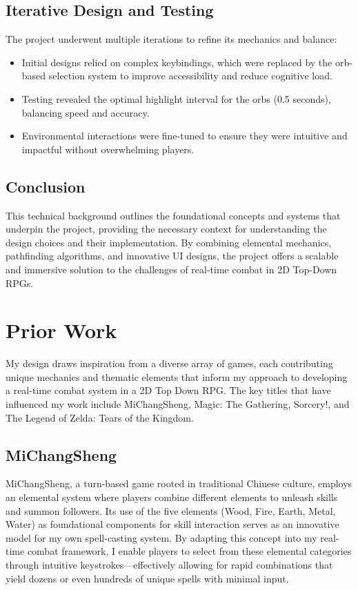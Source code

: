 \documentclass[10pt,twocolumn]{article}
\begin{document}
\subsection{Iterative Design and Testing}
The project underwent multiple iterations to refine its mechanics and balance:
\begin{itemize}
    \item Initial designs relied on complex keybindings, which were replaced by the orb-based selection system to improve accessibility and reduce cognitive load.
    \item Testing revealed the optimal highlight interval for the orbs (0.5 seconds), balancing speed and accuracy.
    \item Environmental interactions were fine-tuned to ensure they were intuitive and impactful without overwhelming players.
\end{itemize}

\subsection{Conclusion}
This technical background outlines the foundational concepts and systems that underpin the project, providing the necessary context for understanding the design choices and their implementation. By combining elemental mechanics, pathfinding algorithms, and innovative UI designs, the project offers a scalable and immersive solution to the challenges of real-time combat in 2D Top-Down RPGs.

\section{Prior Work}
My design draws inspiration from a diverse array of games, each contributing unique mechanics and thematic elements that inform my approach to developing a real-time combat system in a 2D Top Down RPG. The key titles that have influenced my work include MiChangSheng, Magic: The Gathering, Sorcery!, and The Legend of Zelda: Tears of the Kingdom.

\subsection{MiChangSheng}
MiChangSheng, a turn-based game rooted in traditional Chinese culture, employs an elemental system where players combine different elements to unleash skills and summon followers. Its use of the five elements (Wood, Fire, Earth, Metal, Water) as foundational components for skill interaction serves as an innovative model for my own spell-casting system. By adapting this concept into my real-time combat framework, I enable players to select from these elemental categories through intuitive keystrokes—effectively allowing for rapid combinations that yield dozens or even hundreds of unique spells with minimal input.
\end{document}
